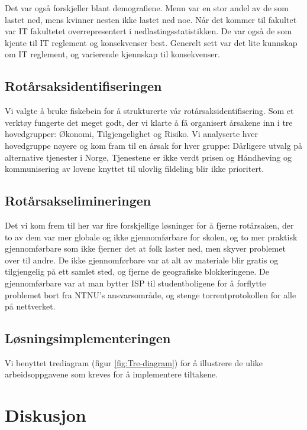 Det var også forskjeller blant demografiene. Menn var en stor andel av de som lastet ned, mens kvinner nesten ikke lastet ned noe. Når det kommer til fakultet var IT fakultetet overrepresentert i nedlastingsstatistikken. De var også de som kjente til IT reglement og konsekvenser best. Generelt sett var det lite kunnskap om IT reglement, og varierende kjennskap til konsekvenser. 

\subsection{Rotårsaksidentifiseringen}
Vi valgte å bruke fiskebein for å strukturerte vår rotårsaksidentifisering. Som et verktøy fungerte det meget godt, der vi klarte å få organisert årsakene inn i tre hovedgrupper: Økonomi, Tilgjengelighet og Risiko. Vi analyserte hver hovedgruppe nøyere og kom fram til en årsak for hver gruppe: Dårligere utvalg på alternative tjenester i Norge, Tjenestene er ikke verdt prisen og Håndheving og kommunisering av lovene knyttet til ulovlig fildeling blir ikke prioritert. 

\subsection{Rotårsakselimineringen}
Det vi kom frem til her var fire forskjellige løsninger for å fjerne rotårsaken, der to av dem var mer globale og ikke gjennomførbare for skolen, og to mer praktisk gjennomførbare som ikke fjerner det at folk laster ned, men skyver problemet over til andre. De ikke gjennomførbare var at alt av materiale blir gratis og tilgjengelig på ett samlet sted, og fjerne de geografiske blokkeringene. De gjennomførbare var at man bytter ISP til studentboligene for å forflytte problemet bort fra NTNU's ansvarsområde, og stenge torrentprotokollen for alle på nettverket. 

\subsection{Løsningsimplementeringen}
Vi benyttet trediagram (figur \ref{fig:Tre-diagram}) for å illustrere de ulike arbeidsoppgavene som kreves for å implementere tiltakene.

\section{Diskusjon}

